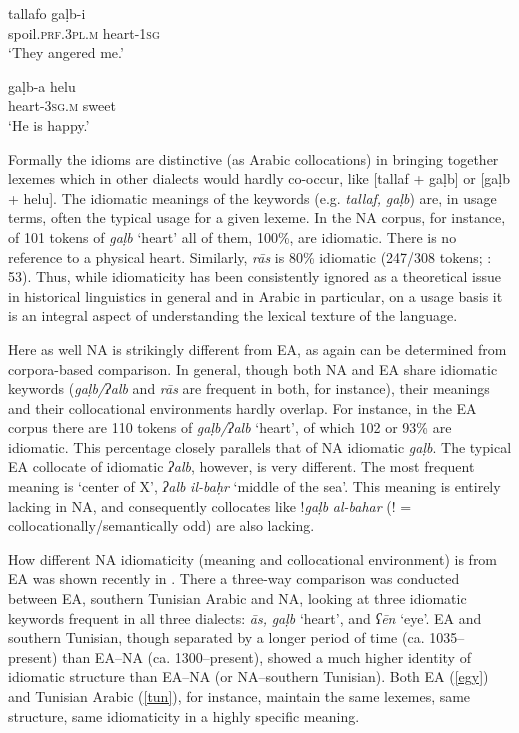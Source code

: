 \documentclass[output=paper]{langsci/langscibook}
\begin{document}
\ea\label{galb}
\ea
\gll tallafo gaḷb-i\\
     spoil.\textsc{prf.3pl.m} heart-1\textsc{sg}\\
\glt ‘They angered me.’

\ex 
\gll gaḷb-a helu\\
     heart-\textsc{3sg.m} sweet\\
\glt ‘He is happy.’\label{helu}
\z
\z

Formally the idioms are distinctive (as Arabic collocations) in bringing together lexemes which in other dialects would hardly co-occur, like [tallaf + gaḷb] or [gaḷb + helu]. The idiomatic meanings of the keywords (e.g. \textit{tallaf,} \textit{gaḷb}) are, in usage terms, often the typical usage for a given lexeme. In the NA corpus, for instance, of 101 tokens of \textit{gaḷb} ‘heart’ all of them, 100\%, are idiomatic. There is no reference to a physical heart. Similarly, \textit{rās} is 80\% idiomatic (247/308 tokens; \citealt{Ritt-Benmimounetc2017}: 53). Thus, while idiomaticity has been consistently ignored as a theoretical issue in historical linguistics in general and in Arabic in particular, on a usage basis it is an integral aspect of understanding the lexical texture of the language. 

Here as well NA is strikingly different from EA, as again can be determined from corpora-based comparison. In general, though both NA and EA share idiomatic keywords (\textit{gaḷb/ʔalb} and \textit{rās} are frequent in both, for instance), their meanings and their collocational environments hardly overlap. For instance, in the EA corpus there are 110 tokens of \textit{gaḷb/ʔalb} ‘heart’, of which 102 or 93\% are idiomatic. This percentage closely parallels that of NA idiomatic \textit{gaḷb}. The typical EA collocate of idiomatic \textit{ʔalb}, however, is very different. The most frequent meaning is ‘center of X’, \textit{ʔalb} \textit{il-baḥr} ‘middle of the sea’. This meaning is entirely lacking in NA, and consequently collocates like !\textit{gaḷb} \textit{al-bahar} (! = collocationally/semantically odd) are also lacking.

How different NA idiomaticity (meaning and collocational environment) is from EA was shown recently in \citet{Ritt-Benmimounetc2017}. There a three-way comparison was conducted between EA, southern Tunisian Arabic and NA, looking at three idiomatic keywords frequent in all three dialects: \textit{{\R}ās,} \textit{gaḷb} ‘heart’, and \textit{ʕēn} ‘eye’. EA and southern Tunisian, though separated by a longer period of time (ca. 1035–present) than EA–NA (ca. 1300–present), showed a much higher identity of idiomatic structure than EA–NA (or NA–southern Tunisian). Both EA (\ref{egy}) and Tunisian Arabic (\ref{tun}), for instance, maintain the same lexemes, same structure, same idiomaticity in a highly specific meaning.
\end{document}
